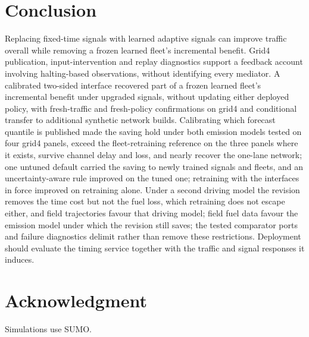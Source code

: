 \section{Conclusion}\label{sec:conclusion}
Replacing fixed-time signals with learned adaptive signals can improve traffic overall while removing a frozen learned fleet's incremental
benefit. Grid4 publication, input-intervention and replay diagnostics support a feedback account involving halting-based observations,
without identifying every mediator. A calibrated two-sided interface recovered part of a frozen learned fleet's incremental benefit under
upgraded signals, without updating either deployed policy, with fresh-traffic and fresh-policy confirmations on grid4 and conditional
transfer to additional synthetic network builds. Calibrating which forecast quantile is published made the saving hold under both
emission models tested on four grid4 panels, exceed the fleet-retraining reference on the three panels where it exists, survive channel
delay and loss, and nearly recover the one-lane network; one untuned default carried the saving to newly trained signals and fleets, and
an uncertainty-aware rule improved on the tuned one; retraining with the interfaces in force improved on retraining alone. Under a second
driving model the revision removes the time cost but not the fuel loss, which retraining does not escape either, and field trajectories
favour that driving model; field fuel data favour the emission model under which the revision still saves; the tested comparator ports and failure
diagnostics delimit rather than remove these restrictions. Deployment should evaluate the timing service together with the
traffic and signal responses it induces.

\section*{Acknowledgment}
Simulations use SUMO.

